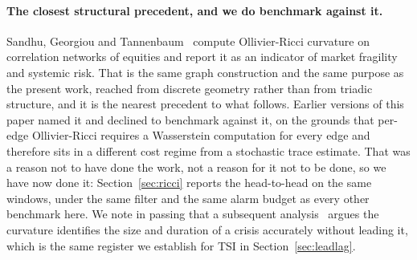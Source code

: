 \documentclass[11pt,a4paper]{article}
\begin{document}
\paragraph{The closest structural precedent, and we do benchmark against it.}
Sandhu, Georgiou and Tannenbaum~\cite{sandhu2016} compute Ollivier-Ricci
curvature on correlation networks of equities and report it as an indicator of
market fragility and systemic risk. That is the same graph construction and the
same purpose as the present work, reached from discrete geometry rather than
from triadic structure, and it is the nearest precedent to what follows.
Earlier versions of this paper named it and declined to benchmark against it,
on the grounds that per-edge Ollivier-Ricci requires a Wasserstein computation
for every edge and therefore sits in a different cost regime from a stochastic
trace estimate. That was a reason not to have done the work, not a reason for
it not to be done, so we have now done it: Section~\ref{sec:ricci} reports the
head-to-head on the same windows, under the same filter and the same alarm
budget as every other benchmark here. We note in passing that a subsequent
analysis~\cite{expost2024} argues the curvature identifies the size and
duration of a crisis accurately without leading it, which is the same register
we establish for TSI in Section~\ref{sec:leadlag}.
\end{document}
